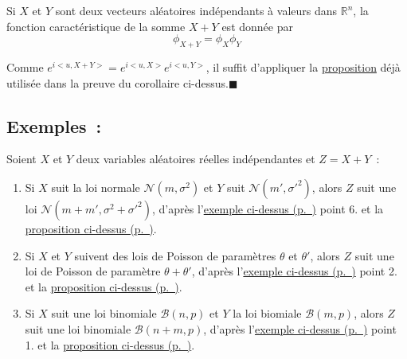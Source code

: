\begin{proposition}[{Somme}]\label{IV-fct_carac_sum}

Si \(X\) et \(Y\) sont deux vecteurs aléatoires indépendants à valeurs
dans \(\mathbb{R}^n\), la fonction caractéristique de la somme \(X+Y\)
est donnée par \[ \phi_{X+Y} = \phi_X\phi_Y\]
\end{proposition}

\begin{preuve}
Comme \(e^{i< u, X+Y>}=e^{i< u, X>}e^{i< u, Y>}\), il suffit d'appliquer
la \href{Probabilité\%20II.pdf\%20\#indep_fct}{proposition} déjà
utilisée dans la preuve du corollaire ci-dessus.\hfill$\blacksquare$
\end{preuve}

\subsection*{Exemples~:}\label{IV-exemples}

Soient \(X\) et \(Y\) deux variables aléatoires réelles indépendantes et
\(Z = X+Y\)~:

\begin{enumerate}
\def\labelenumi{\arabic{enumi}.}
\tightlist
\item
  Si \(X\) suit la loi normale \(\mathcal{N}(m,\sigma^2)\) et \(Y\) suit
  \(\mathcal{N}(m',\sigma'^2)\), alors \(Z\) suit une loi
  \(\mathcal{N}(m+m',\sigma^2+\sigma'^2)\), d'après
  l'\protect\hyperref[IV-ex]{exemple ci-dessus (p.~\pageref*{IV-ex})}
  point 6. et la \protect\hyperref[IV-fct_carac_sum]{proposition
  ci-dessus (p.~\pageref*{IV-fct_carac_sum})}.
\item
  Si \(X\) et \(Y\) suivent des lois de Poisson de paramètres \(\theta\)
  et \(\theta'\), alors \(Z\) suit une loi de Poisson de paramètre
  \(\theta + \theta'\), d'après l'\protect\hyperref[IV-ex]{exemple
  ci-dessus (p.~\pageref*{IV-ex})} point 2. et la
  \protect\hyperref[IV-fct_carac_sum]{proposition
  ci-dessus (p.~\pageref*{IV-fct_carac_sum})}.
\item
  Si \(X\) suit une loi binomiale \(\mathcal{B}(n,p)\) et \(Y\) la loi
  biomiale \(\mathcal{B}(m,p)\), alors \(Z\) suit une loi binomiale
  \(\mathcal{B}(n+m,p)\), d'après l'\protect\hyperref[IV-ex]{exemple
  ci-dessus (p.~\pageref*{IV-ex})} point 1. et la
  \protect\hyperref[IV-fct_carac_sum]{proposition
  ci-dessus (p.~\pageref*{IV-fct_carac_sum})}.
\end{enumerate}

